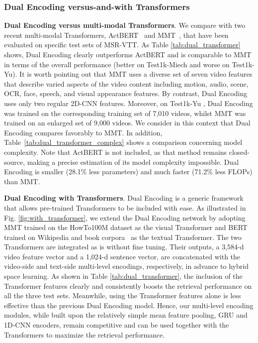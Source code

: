 \subsubsection{Dual Encoding versus-and-with Transformers}\label{sssec:trans}
\textbf{Dual Encoding versus multi-modal Transformers}. We compare with two recent multi-modal Transformers, \ie ActBERT~\cite{zhu2020actbert} and MMT~\cite{gabeur2020multi}, that have been evaluated on specific test sets of MSR-VTT. 
As Table \ref{tab:dual_transformer} shows, Dual Encoding clearly outperforms ActBERT and is comparable to MMT in terms of the overall performance (better on Test1k-Miech and worse on Test1k-Yu). It is worth pointing out that MMT uses a diverse set of seven video features that describe varied aspects of the video content including motion, audio, scene, OCR, face, speech, and visual appearance features. By contrast, Dual Encoding uses only two regular 2D-CNN features. 
Moreover, on Test1k-Yu \cite{yu2018joint}, Dual Encoding was trained on the corresponding training set of 7,010 videos, whilst MMT was trained on an enlarged set of 9,000 videos.
We consider in this context that Dual Encoding compares favorably to MMT. 
In addition, Table~\ref{tab:dual_transformer_complex} shows a comparison concerning model complexity. Note that ActBERT is not included, as that method remains closed-source, making a precise estimation of its model complexity impossible. Dual Encoding is smaller (28.1\% less parameters) and much faster (71.2\% less FLOPs) than MMT. 



\textbf{Dual Encoding with Transformers}. Dual Encoding is a generic framework that allows pre-trained Transformers to be included with ease. As illustrated in Fig. \ref{fig:with_transformer},  we extend the Dual Encoding network by adopting MMT trained on the HowTo100M dataset \cite{miech2019howto100m} as the visual Transformer and BERT~\cite{bert-toolbox} trained on Wikipedia and book corpora~\cite{zhu2015aligning} as the textual Transformer. The two Transformers are integrated as is without fine tuning. Their outputs, \ie a 3,584-d video feature vector and a 1,024-d sentence vector, are concatenated with the video-side and text-side multi-level encodings, respectively, in advance to hybrid space learning.
As shown in Table \ref{tab:dual_transformer}, the inclusion of the Transformer features clearly and consistently boosts the retrieval performance on all the three test sets. Meanwhile, using the Transformer features alone is less effective than the previous Dual Encoding model. Hence, our multi-level encoding modules, while built upon the relatively simple mean feature pooling, GRU and 1D-CNN encoders, remain competitive and can be used together with the Transformers to maximize the retrieval performance. 


